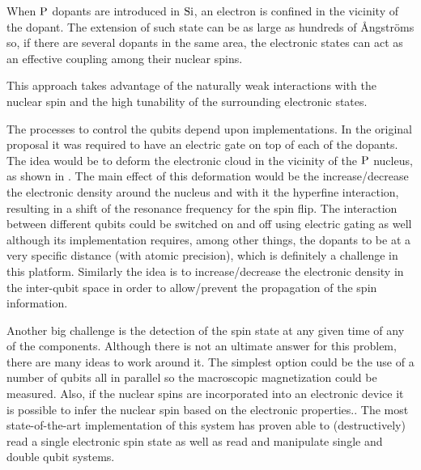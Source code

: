 When $\ce{P}$ dopants are introduced in $\ce{Si}$, an electron is confined in the vicinity of the dopant. The extension of such state can be as large as hundreds of Ångströms so, if there are several dopants in the same area, the electronic states can act as an effective coupling among their nuclear spins\cite{Slichter1990}.

This approach takes advantage of the naturally weak interactions with the nuclear spin and the high tunability of the surrounding electronic states.


The processes to control the qubits depend upon implementations. In the original proposal it was required to have an electric gate on top of each of the dopants. The idea would be to deform the electronic cloud in the vicinity of the $\ce{P}$ nucleus, as shown in . The main effect of this deformation would be the increase/decrease the electronic density around the nucleus and with it the hyperfine interaction, resulting in a shift of the resonance frequency for the spin flip.
The interaction between different qubits could be switched on and off using electric gating as well although its implementation requires, among other things, the dopants to be at a very specific distance (with atomic precision), which is definitely a challenge in this platform. Similarly the idea is to increase/decrease the electronic density in the inter-qubit space in order to allow/prevent the propagation of the spin information.


Another big challenge is the detection of the spin state at any given time of any of the components. Although there is not an ultimate answer for this problem, there are many ideas to work around it. The simplest option could be the use of a number of qubits all in parallel so the macroscopic magnetization could be measured. Also, if the nuclear spins are incorporated into an electronic device it is possible to infer the nuclear spin based on the electronic properties.\cite{Kane1992,Wald1994,Stich1996,Dixon1997,Dobers1988,Stegner2006}. The most state-of-the-art implementation of this system has proven able to (destructively) read a single electronic spin state as well as read and manipulate single and double qubit systems\cite{Morello2010,Pla2012,Dehollain2014}.

